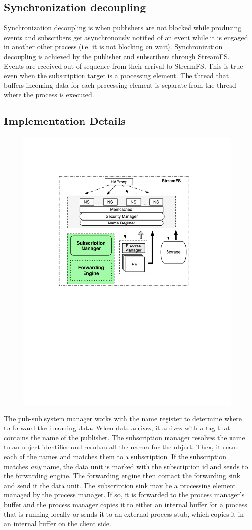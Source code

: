 \subsection{Synchronization decoupling}
Synchronization decoupling is when publishers are not blocked while producing events and subscribers get asynchronously notified
of an event while it is engaged in another other process (i.e. it is not blocking on wait).
Synchronization decoupling is achieved by the publisher and subscribers through StreamFS.  Events are received out of sequence
from their arrival to StreamFS.  This is true even when the subscription target is a processing element.  The thread that buffers
incoming data for each processing element is separate from the thread where the process is executed.



\subsection{Implementation Details}

\begin{figure}[h!] %
\centering
\includegraphics[width=.55\columnwidth]{figs/submngr}
\caption{}
\label{fig:submngr}
\end{figure}

The pub-sub system manager works with the name register to determine where to forward the incoming data.  When data arrives, it arrives
with a tag that contains the name of the publisher.  The subscription manager resolves the name to an object identifier and resolves
all the names for the object.  Then, it scans each of the names and matches them to a subscription.  If the subscription matches \emph{any}
name, the data unit is marked with the subscription id and sends to the forwarding engine.  The forwarding engine then
contact the forwarding sink and send it the data unit.  The subscription sink may be a processing element managed by the process manager.
If so, it is forwarded to the process manager's buffer and the process manager copies it to either an internal buffer for a
process that is running locally or sends it to an external process stub, which copies it in an internal buffer on the client side.
